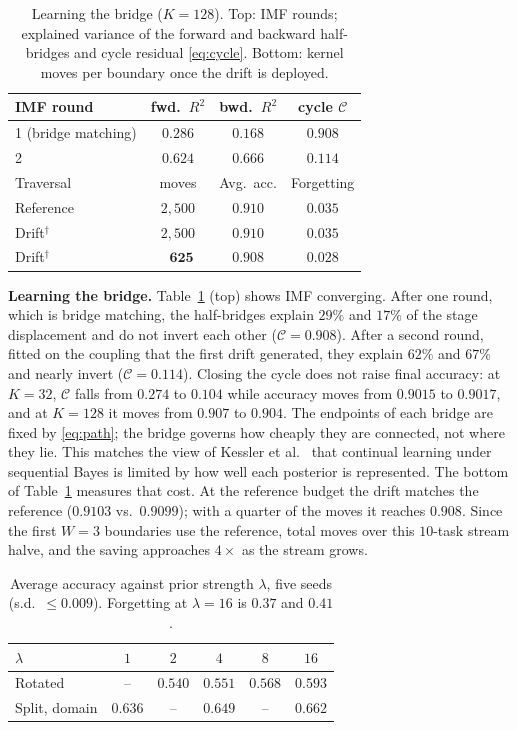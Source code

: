 \documentclass{article}
\begin{document}
\begin{table}[t]
\centering
\caption{Learning the bridge ($K=128$). Top: IMF rounds; explained variance of
the forward and backward half-bridges and cycle residual \eqref{eq:cycle}.
Bottom: kernel moves per boundary once the drift is deployed.}
\label{tab:bridge}
\setlength{\tabcolsep}{4.5pt}
\begin{tabular}{lccc}
\toprule
IMF round & fwd.\ $R^2$ & bwd.\ $R^2$ & cycle $\mathcal{C}$ \\
\midrule
1 (bridge matching) & $0.286$ & $0.168$ & $0.908$ \\
2 & $\mathbf{0.624}$ & $\mathbf{0.666}$ & $\mathbf{0.114}$ \\
\midrule
Traversal & moves & Avg.\ acc. & Forgetting \\
\midrule
Reference & $2{,}500$ & $0.910$ & $0.035$ \\
Drift$^\dagger$ & $2{,}500$ & $0.910$ & $0.035$ \\
Drift$^\dagger$ & $\phantom{0}\mathbf{625}$ & $0.908$ & $0.028$ \\
\bottomrule
\end{tabular}
\end{table}

\textbf{Learning the bridge.} Table~\ref{tab:bridge} (top) shows IMF
converging. After one round, which is bridge matching, the half-bridges explain
$29\%$ and $17\%$ of the stage displacement and do not invert each other
($\mathcal{C}=0.908$). After a second round, fitted on the coupling that the
first drift generated, they explain $62\%$ and $67\%$ and nearly invert
($\mathcal{C}=0.114$). Closing the cycle does not raise final accuracy: at
$K=32$, $\mathcal{C}$ falls from $0.274$ to $0.104$ while accuracy moves from
$0.9015$ to $0.9017$, and at $K=128$ it moves from $0.907$ to $0.904$. The
endpoints of each bridge are fixed by \eqref{eq:path}; the bridge governs how
cheaply they are connected, not where they lie. This matches the view of
Kessler et al.~\cite{kessler2023sequential} that continual learning under
sequential Bayes is limited by how well each posterior is represented. The
bottom of Table~\ref{tab:bridge} measures that cost. At the reference budget the
drift matches the reference ($0.9103$ vs.\ $0.9099$); with a quarter of the
moves it reaches $0.908$. Since the first $W=3$ boundaries use the reference,
total moves over this $10$-task stream halve, and the saving approaches $4\times$
as the stream grows.

\begin{table}[t]
\centering
\caption{Average accuracy against prior strength $\lambda$, five seeds
(s.d.\ $\le0.009$). Forgetting at $\lambda=16$ is $0.37$ and $0.41$.}
\label{tab:other}
\setlength{\tabcolsep}{4.5pt}
\begin{tabular}{lccccc}
\toprule
$\lambda$ & $1$ & $2$ & $4$ & $8$ & $16$ \\
\midrule
Rotated & -- & $0.540$ & $0.551$ & $0.568$ & $\mathbf{0.593}$ \\
Split, domain & $0.636$ & -- & $0.649$ & -- & $\mathbf{0.662}$ \\
\bottomrule
\end{tabular}
\end{table}
\end{document}
